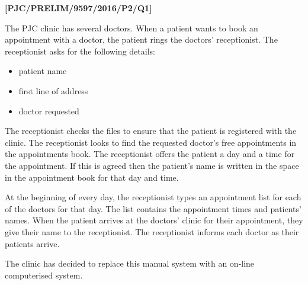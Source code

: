 \item \textbf{{[}PJC/PRELIM/9597/2016/P2/Q1{]} }

The PJC clinic has several doctors. When a patient wants to book an
appointment with a doctor, the patient rings the doctors' receptionist.
The receptionist asks for the following details:
\begin{itemize}
\item patient name 
\item first line of address
\item doctor requested 
\end{itemize}
The receptionist checks the files to ensure that the patient is registered
with the clinic. The receptionist looks to find the requested doctor's
free appointments in the appointments book. The receptionist offers
the patient a day and a time for the appointment. If this is agreed
then the patient's name is written in the space in the appointment
book for that day and time. 

At the beginning of every day, the receptionist types an appointment
list for each of the doctors for that day. The list contains the appointment
times and patients\textquoteright{} names. When the patient arrives
at the doctors' clinic for their appointment, they give their name
to the receptionist. The receptionist informs each doctor as their
patients arrive. 

The clinic has decided to replace this manual system with an on-line
computerised system. 

